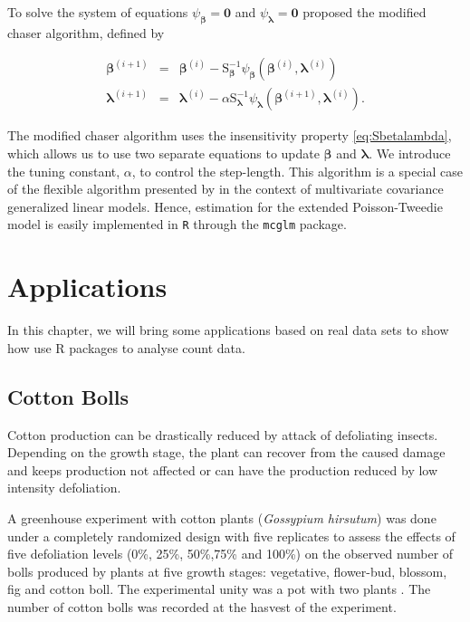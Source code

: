 \documentclass[9pt,a5paper,]{book}
\theoremstyle{definition}
\theoremstyle{definition}
\theoremstyle{remark}
\begin{document}
To solve the system of equations
\(\psi_{\boldsymbol{\beta}} = \boldsymbol{0}\) and
\(\psi_{\boldsymbol{\lambda}} = \boldsymbol{0}\) \citet{Jorgensen2004}
proposed the modified chaser algorithm, defined by

\begin{eqnarray*}
\label{chaser}
\boldsymbol{\beta}^{(i+1)} &=& \boldsymbol{\beta}^{(i)} - \mathrm{S}_{\boldsymbol{\beta}}^{-1} \psi_{\boldsymbol{\beta}}(\boldsymbol{\beta}^{(i)}, \boldsymbol{\lambda}^{(i)}) \nonumber \\
\boldsymbol{\lambda}^{(i+1)} &=& \boldsymbol{\lambda}^{(i)} - \alpha \mathrm{S}_{\boldsymbol{\lambda}}^{-1} \psi_{\boldsymbol{\lambda}}(\boldsymbol{\beta}^{(i+1)}, \boldsymbol{\lambda}^{(i)}).
\end{eqnarray*}

The modified chaser algorithm uses the insensitivity property
\eqref{eq:Sbetalambda}, which allows us to use two separate equations to
update \(\boldsymbol{\beta}\) and \(\boldsymbol{\lambda}\). We introduce
the tuning constant, \(\alpha\), to control the step-length. This
algorithm is a special case of the flexible algorithm presented by
\citet{Bonat2016a} in the context of multivariate covariance generalized
linear models. Hence, estimation for the extended Poisson-Tweedie model
is easily implemented in \texttt{R} through the \texttt{mcglm}
\citep{Bonat2016c} package.

\chapter{Applications}\label{applications}

In this chapter, we will bring some applications based on real data sets
to show how use R packages to analyse count data.

\section{Cotton Bolls}\label{cotton-bolls}

Cotton production can be drastically reduced by attack of defoliating
insects. Depending on the growth stage, the plant can recover from the
caused damage and keeps production not affected or can have the
production reduced by low intensity defoliation.

A greenhouse experiment with cotton plants (\emph{Gossypium hirsutum})
was done under a completely randomized design with five replicates to
assess the effects of five defoliation levels (0\%, 25\%, 50\%,75\% and
100\%) on the observed number of bolls produced by plants at five growth
stages: vegetative, flower-bud, blossom, fig and cotton boll. The
experimental unity was a pot with two plants \citep[for
more]{Silva2012a}. The number of cotton bolls was recorded at the
hasvest of the experiment.
\end{document}
